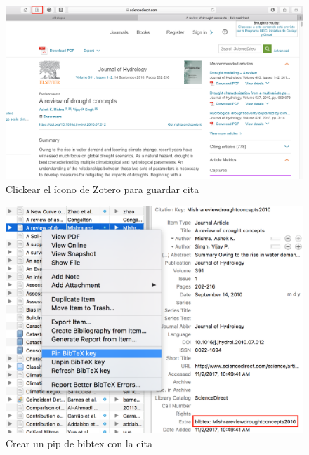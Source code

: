 \documentclass[11pt,]{article}
\begin{document}
\begin{figure}[!h]
\begin{center}
\includegraphics[width=\textwidth]{Figuras/zotero_web.png}
\caption{Clickear el ícono de Zotero para guardar cita}
\label{etiqueta_figura2}
\end{center}
\end{figure}

\begin{figure}[!h]
\begin{center}
\includegraphics[width=\textwidth]{Figuras/zotero_pin.png}
\caption{Crear un pip de bibtex con la cita}
\label{etiqueta_figura3}
\end{center}
\end{figure}
\end{document}
